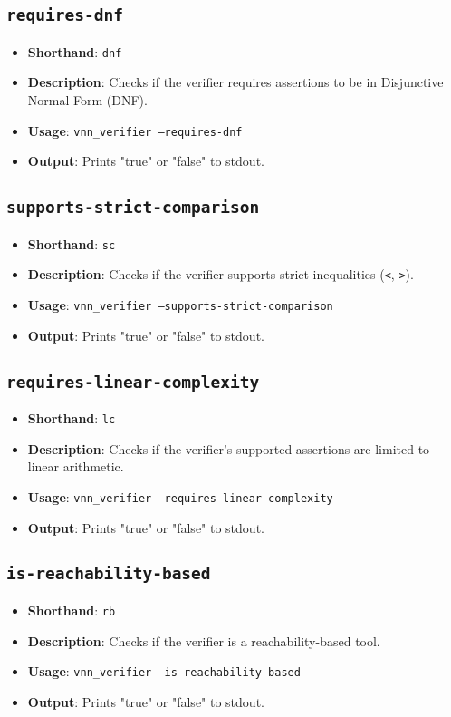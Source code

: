 \subsection{\texttt{requires-dnf}}
\begin{itemize}
    \item \textbf{Shorthand}: \texttt{dnf}
    \item \textbf{Description}: Checks if the verifier requires assertions to be in Disjunctive Normal Form (DNF). 
    \item \textbf{Usage}: \texttt{vnn\_verifier --requires-dnf}
    \item \textbf{Output}: Prints "true" or "false" to stdout.
\end{itemize}

\subsection{\texttt{supports-strict-comparison}}
\begin{itemize}
    \item \textbf{Shorthand}: \texttt{sc}
    \item \textbf{Description}: Checks if the verifier supports strict inequalities (\texttt{<}, \texttt{>}). 
    \item \textbf{Usage}: \texttt{vnn\_verifier --supports-strict-comparison}
    \item \textbf{Output}: Prints "true" or "false" to stdout.
\end{itemize}

\subsection{\texttt{requires-linear-complexity}}
\begin{itemize}
    \item \textbf{Shorthand}: \texttt{lc}
    \item \textbf{Description}: Checks if the verifier's supported assertions are limited to linear arithmetic. 
    \item \textbf{Usage}: \texttt{vnn\_verifier --requires-linear-complexity}
    \item \textbf{Output}: Prints "true" or "false" to stdout.
\end{itemize}

\subsection{\texttt{is-reachability-based}}
\begin{itemize}
    \item \textbf{Shorthand}: \texttt{rb}
    \item \textbf{Description}: Checks if the verifier is a reachability-based tool. 
    \item \textbf{Usage}: \texttt{vnn\_verifier --is-reachability-based}
    \item \textbf{Output}: Prints "true" or "false" to stdout.
\end{itemize}

